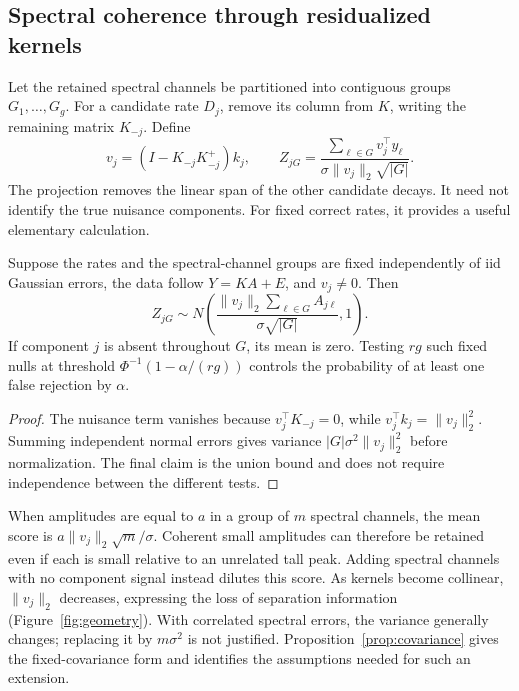 \subsection{Spectral coherence through residualized kernels}\label{sec:screen}
Let the retained spectral channels be partitioned into contiguous groups $G_1,\ldots,G_g$. For a candidate rate $D_j$, remove its column from $K$, writing the remaining matrix $K_{-j}$. Define
\begin{equation}\label{eq:score}
 v_j=(I-K_{-j}K_{-j}^+)k_j,\qquad
 Z_{jG}=\frac{\sum_{\ell\in G}v_j^\top y_\ell}
 {\sigma\|v_j\|_2\sqrt{|G|}}.
\end{equation}
The projection removes the linear span of the other candidate decays. It need not identify the true nuisance components. For fixed correct rates, it provides a useful elementary calculation.

\begin{Proposition}\label{prop:screen}
Suppose the rates and the spectral-channel groups are fixed independently of iid Gaussian errors, the data follow $Y=KA+E$, and $v_j\ne0$. Then
\begin{equation}\label{eq:scoremean}
 Z_{jG}\sim N\left(
 \frac{\|v_j\|_2\sum_{\ell\in G}A_{j\ell}}{\sigma\sqrt{|G|}},1\right).
\end{equation}
If component $j$ is absent throughout $G$, its mean is zero. Testing $rg$ such fixed nulls at threshold $\Phi^{-1}(1-\alpha/(rg))$ controls the probability of at least one false rejection by $\alpha$.
\end{Proposition}
\begin{proof}
The nuisance term vanishes because $v_j^\top K_{-j}=0$, while $v_j^\top k_j=\|v_j\|_2^2$. Summing independent normal errors gives variance $|G|\sigma^2\|v_j\|_2^2$ before normalization. The final claim is the union bound and does not require independence between the different tests.
\end{proof}

When amplitudes are equal to $a$ in a group of $m$ spectral channels, the mean score is $a\|v_j\|_2\sqrt m/\sigma$. Coherent small amplitudes can therefore be retained even if each is small relative to an unrelated tall peak. Adding spectral channels with no component signal instead dilutes this score. As kernels become collinear, $\|v_j\|_2$ decreases, expressing the loss of separation information (Figure~\ref{fig:geometry}). With correlated spectral errors, the variance generally changes; replacing it by $m\sigma^2$ is not justified. Proposition~\ref{prop:covariance} gives the fixed-covariance form and identifies the assumptions needed for such an extension.

